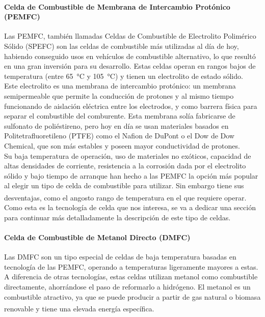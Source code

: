 \paragraph{Celda de Combustible de Membrana de Intercambio Protónico (PEMFC)}

Las PEMFC, también llamadas Celdas de Combustible de Electrolito Polimérico Sólido (SPEFC) son las celdas de combustible más utilizadas al día de hoy, habiendo conseguido usos en vehículos de combustible alternativo, lo que resultó en una gran inversión para su desarrollo. Estas celdas operan en rangos bajos de temperatura (entre \SI{65}{\celsius} y \SI{105}{\celsius}) y tienen un electrolito de estado sólido.\\
    
Este electrolito es una membrana de intercambio protónico: un membrana semipermeable que permite la conducción de protones y al mismo tiempo funcionando de aislación eléctrica entre los electrodos, y como barrera física para separar el combustible del comburente. Esta membrana solía fabricarse de sulfonato de poliéstireno, pero hoy en día se usan materiales basados en Politetrafluoretileno (PTFE) como el Nafion de DuPont o el Dow de Dow Chemical, que son más estables y poseen mayor conductividad de protones.\\

Su baja temperatura de operación, uso de materiales no exóticos, capacidad de altas densidades de corriente, resistencia a la corrosión dada por el electrolito sólido y bajo tiempo de arranque han hecho a las PEMFC la opción más popular al elegir un tipo de celda de combustible para utilizar. Sin embargo tiene sus desventajas, como el angosto rango de temperatura en el que requiere operar.\textsuperscript{\cite{FC-FundAndAppl}\cite{FCHandbook}}\\

Como esta es la tecnología de celda que nos interesa, se va a dedicar una sección para continuar más detalladamente la descripción de este tipo de celdas.\\

\paragraph{Celda de Combustible de Metanol Directo (DMFC)}

Las DMFC son un tipo especial de celdas de baja temperatura basadas en tecnología de las PEMFC, operando a temperaturas ligeramente mayores a estas. A diferencia de otras tecnologías, estas celdas utilizan metanol como combustible directamente, ahorrándose el paso de reformarlo a hidrógeno. El metanol es un combustible atractivo, ya que se puede producir a partir de gas natural o biomasa renovable y tiene una elevada energía específica.\textsuperscript{\cite{FC-FundAndAppl}\cite{FCHandbook}}\\


